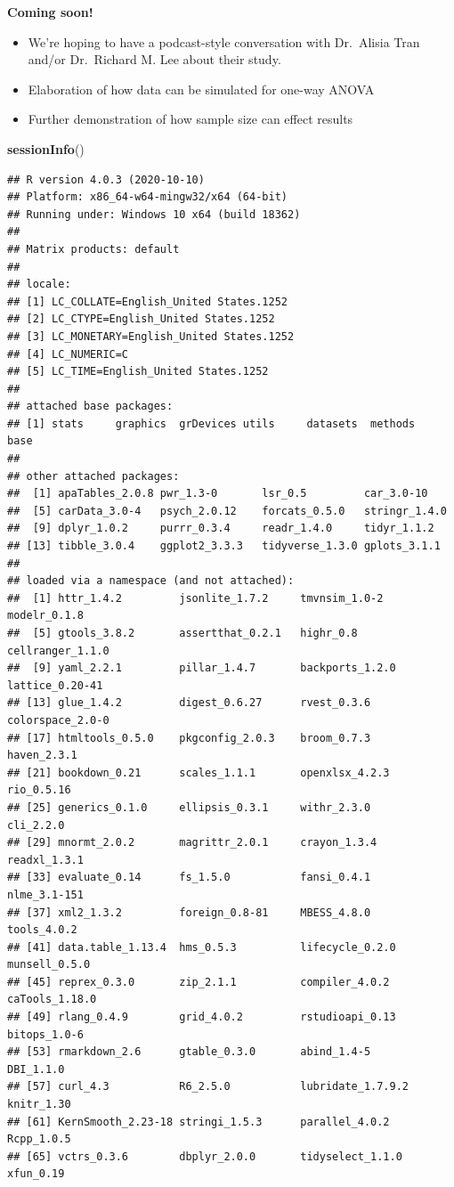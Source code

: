 \documentclass[
  english,
]{book}
\newenvironment{Shaded}{\begin{snugshade}}{\end{snugshade}}
\newcommand{\KeywordTok}[1]{\textcolor[rgb]{0.13,0.29,0.53}{\textbf{#1}}}
\newcommand{\NormalTok}[1]{#1}
\providecommand{\tightlist}{%
  \setlength{\itemsep}{0pt}\setlength{\parskip}{0pt}}
\begin{document}
\textbf{Coming soon!}

\begin{itemize}
\tightlist
\item
  We're hoping to have a podcast-style conversation with Dr.~Alisia Tran and/or Dr.~Richard M. Lee about their study.
\item
  Elaboration of how data can be simulated for one-way ANOVA
\item
  Further demonstration of how sample size can effect results
\end{itemize}

\begin{Shaded}
\begin{Highlighting}[]
\KeywordTok{sessionInfo}\NormalTok{()}
\end{Highlighting}
\end{Shaded}

\begin{verbatim}
## R version 4.0.3 (2020-10-10)
## Platform: x86_64-w64-mingw32/x64 (64-bit)
## Running under: Windows 10 x64 (build 18362)
## 
## Matrix products: default
## 
## locale:
## [1] LC_COLLATE=English_United States.1252 
## [2] LC_CTYPE=English_United States.1252   
## [3] LC_MONETARY=English_United States.1252
## [4] LC_NUMERIC=C                          
## [5] LC_TIME=English_United States.1252    
## 
## attached base packages:
## [1] stats     graphics  grDevices utils     datasets  methods   base     
## 
## other attached packages:
##  [1] apaTables_2.0.8 pwr_1.3-0       lsr_0.5         car_3.0-10     
##  [5] carData_3.0-4   psych_2.0.12    forcats_0.5.0   stringr_1.4.0  
##  [9] dplyr_1.0.2     purrr_0.3.4     readr_1.4.0     tidyr_1.1.2    
## [13] tibble_3.0.4    ggplot2_3.3.3   tidyverse_1.3.0 gplots_3.1.1   
## 
## loaded via a namespace (and not attached):
##  [1] httr_1.4.2         jsonlite_1.7.2     tmvnsim_1.0-2      modelr_0.1.8      
##  [5] gtools_3.8.2       assertthat_0.2.1   highr_0.8          cellranger_1.1.0  
##  [9] yaml_2.2.1         pillar_1.4.7       backports_1.2.0    lattice_0.20-41   
## [13] glue_1.4.2         digest_0.6.27      rvest_0.3.6        colorspace_2.0-0  
## [17] htmltools_0.5.0    pkgconfig_2.0.3    broom_0.7.3        haven_2.3.1       
## [21] bookdown_0.21      scales_1.1.1       openxlsx_4.2.3     rio_0.5.16        
## [25] generics_0.1.0     ellipsis_0.3.1     withr_2.3.0        cli_2.2.0         
## [29] mnormt_2.0.2       magrittr_2.0.1     crayon_1.3.4       readxl_1.3.1      
## [33] evaluate_0.14      fs_1.5.0           fansi_0.4.1        nlme_3.1-151      
## [37] xml2_1.3.2         foreign_0.8-81     MBESS_4.8.0        tools_4.0.2       
## [41] data.table_1.13.4  hms_0.5.3          lifecycle_0.2.0    munsell_0.5.0     
## [45] reprex_0.3.0       zip_2.1.1          compiler_4.0.2     caTools_1.18.0    
## [49] rlang_0.4.9        grid_4.0.2         rstudioapi_0.13    bitops_1.0-6      
## [53] rmarkdown_2.6      gtable_0.3.0       abind_1.4-5        DBI_1.1.0         
## [57] curl_4.3           R6_2.5.0           lubridate_1.7.9.2  knitr_1.30        
## [61] KernSmooth_2.23-18 stringi_1.5.3      parallel_4.0.2     Rcpp_1.0.5        
## [65] vctrs_0.3.6        dbplyr_2.0.0       tidyselect_1.1.0   xfun_0.19
\end{verbatim}

  
\end{document}
